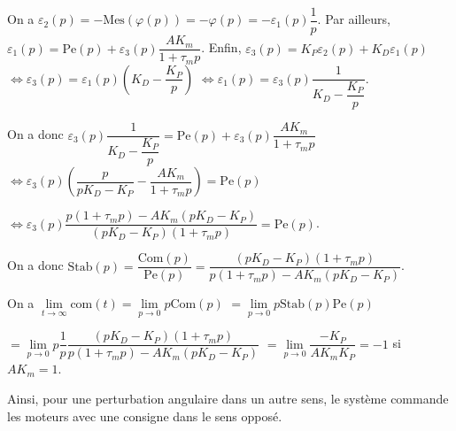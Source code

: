 \ifprof
\begin{corrige}
On a $\varepsilon_2(p) = -\text{Mes}\left( \varphi(p)\right) = -\varphi(p) = -\varepsilon_1(p)\dfrac{1}{p}$. 
Par ailleurs, $\varepsilon_1(p)=\text{Pe}(p)+\varepsilon_3(p)\dfrac{AK_m}{1+\tau_m p}$. 
Enfin, $\varepsilon_3(p)=K_P\varepsilon_2(p)+K_D \varepsilon_1(p)$ $\Leftrightarrow \varepsilon_3(p)=\varepsilon_1(p)\left(K_D-\dfrac{K_P}{p} \right)$
$\Leftrightarrow \varepsilon_1(p) =\varepsilon_3(p)\dfrac{1}{K_D -\dfrac{K_P}{p} }$. 

On a donc  $\varepsilon_3(p)\dfrac{1}{K_D -\dfrac{K_P}{p}}=\text{Pe}(p)+\varepsilon_3(p)\dfrac{AK_m}{1+\tau_m p} $ $\Leftrightarrow \varepsilon_3(p)\left(\dfrac{p}{pK_D-K_P } -\dfrac{AK_m}{1+\tau_m p}\right)=\text{Pe}(p) $ 

$\Leftrightarrow \varepsilon_3(p)\dfrac{p\left(1+\tau_m p \right) - AK_m \left( pK_D-K_P\right) }{\left(pK_D-K_P \right) \left(1+\tau_m p\right)}=\text{Pe}(p) $.

On a donc $\text{Stab}(p)=\dfrac{\text{Com}(p)}{\text{Pe}(p)}=\dfrac{\left(pK_D-K_P \right) \left(1+\tau_m p\right)}{p\left(1+\tau_m p \right) - AK_m \left( pK_D-K_P\right) }$.


\end{corrige}
\else
\fi

\ifprof
\begin{corrige}
On a $\lim\limits_{t\to\infty}\text{com}(t) = \lim\limits_{p\to 0}p\text{Com}(p)$ 
$=\lim\limits_{p\to 0}p\text{Stab}(p)\text{Pe}(p)$ 

  $= \lim\limits_{p\to 0}p\dfrac{1}{p} \dfrac{\left(pK_D-K_P \right) \left(1+\tau_m p\right)}{p\left(1+\tau_m p \right) - AK_m \left( pK_D-K_P\right) }$
   $= \lim\limits_{p\to 0} \dfrac{-K_P }{  AK_m  K_P }=-1$ si $AK_m=1$.
  
  Ainsi, pour une perturbation angulaire dans un autre sens, le système commande les moteurs avec une consigne dans le sens opposé. 
\end{corrige}
\else
\fi

